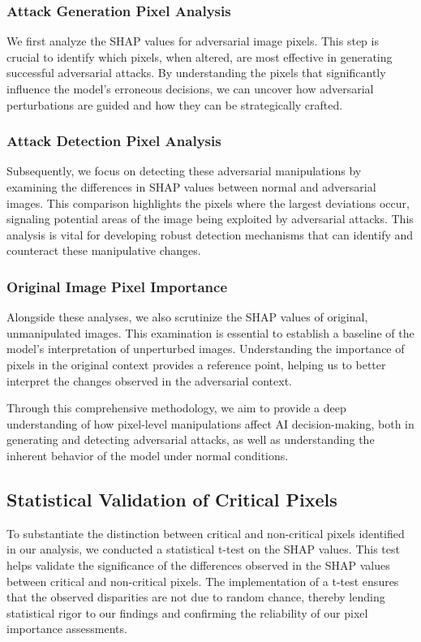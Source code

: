 \documentclass[10pt, conference, a4paper, final]{IEEEtran}
\begin{document}
    \subsubsection{Attack Generation Pixel Analysis}
We first analyze the SHAP values for adversarial image pixels. This step is crucial to identify which pixels, when altered, are most effective 
in generating successful adversarial attacks. By understanding the pixels that significantly influence the model's erroneous decisions, we can 
uncover how adversarial perturbations are guided and how they can be strategically crafted.

\subsubsection{Attack Detection Pixel Analysis}
Subsequently, we focus on detecting these adversarial manipulations by examining the differences in SHAP values between normal and adversarial
images. This comparison highlights the pixels where the largest deviations occur, signaling potential areas of the image being exploited by 
adversarial attacks. This analysis is vital for developing robust detection mechanisms that can identify and counteract these manipulative 
changes.

\subsubsection{Original Image Pixel Importance}
Alongside these analyses, we also scrutinize the SHAP values of original, unmanipulated images. This examination is essential to establish a 
baseline of the model’s interpretation of unperturbed images. Understanding the importance of pixels in the original context provides a 
reference point, helping us to better interpret the changes observed in the adversarial context.

Through this comprehensive methodology, we aim to provide a deep understanding of how pixel-level manipulations affect AI decision-making, 
both in generating and detecting adversarial attacks, as well as understanding the inherent behavior of the model under normal conditions.
\subsection{Statistical Validation of Critical Pixels}
To substantiate the distinction between critical and non-critical pixels identified in our analysis, we conducted a statistical t-test on the
 SHAP values. This test helps validate the significance of the differences observed in the SHAP values between critical and non-critical pixels.
  The implementation of a t-test ensures that the observed disparities are not due to random chance, thereby lending statistical rigor to our 
  findings and confirming the reliability of our pixel importance assessments.
\end{document}
